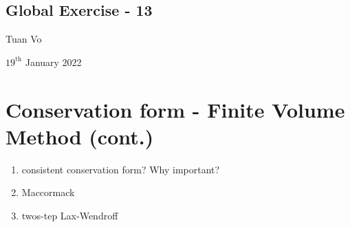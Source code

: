 \documentclass[12pt]{article}
\begin{document}
\begin{center}
	\section*{Global Exercise - 13}
\end{center}
\begin{center}
	Tuan Vo
\end{center}
\begin{center}
	$19^{\text{th}}$ January 2022
\end{center}
\section{Conservation form - Finite Volume Method (cont.)}
\begin{enumerate}
	\item consistent conservation form? Why important?
	\item Maccormack
	\item twos-tep Lax-Wendroff
\end{enumerate}
\end{document}
